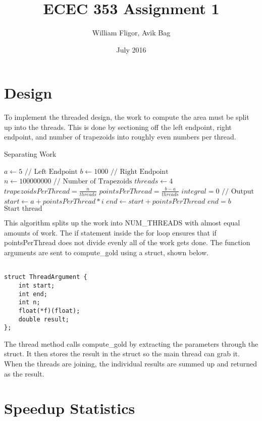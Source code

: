 \documentclass{article}
\title{ECEC 353 Assignment 1}
\author{William Fligor, Avik Bag}
\date{July 2016}
\begin{document}
\maketitle

\section{Design}

To implement the threaded design, the work to compute the area must be split up into the threads. This is done by sectioning off the left endpoint, right endpoint, and number of trapezoids into roughly even numbers per thread.

\begin{algorithm}
\caption{Separating Work}\label{euclid}
\begin{algorithmic}[1]
\STATE $a \gets 5 \text{ // Left Endpoint}$
\STATE $b \gets 1000 \text{ // Right Endpoint}$
\STATE $n \gets 100000000 \text{ // Number of Trapezoids}$
\STATE $threads \gets 4$
\STATE $trapezoidsPerThread = \frac{n}{threads}$
\STATE $pointsPerThread = \frac{b - a}{threads}$
\STATE $integral = 0 \text{ // Output}$
    \STATE $start \gets a + pointsPerThread * i$
    \STATE $end \gets start + pointsPerThread$
        \STATE $end = b$
    \ENDIF
    \STATE $\text{Start thread}$
\ENDFOR
\end{algorithmic}
\end{algorithm}

This algorithm splits up the work into NUM\_THREADS with almost equal amounts of work. The if statement inside the for loop ensures that if pointsPerThread does not divide evenly all of the work gets done. The function arguments are sent to compute\_gold using a struct, shown below.

\begin{lstlisting}[frame=single]  % Start your code-block

struct ThreadArgument {
    int start;
    int end;
    int n;
    float(*f)(float);
    double result;
};

\end{lstlisting}

The thread method calls compute\_gold by extracting the parameters through the struct. It then stores the result in the struct so the main thread can grab it. When the threads are joining, the individual results are summed up and returned as the result. 

\section{Speedup Statistics}
\end{document}
